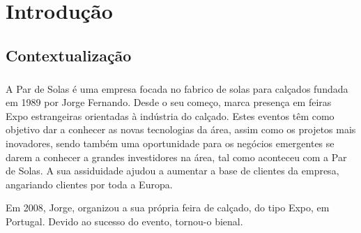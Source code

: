 \documentclass[a4paper,12pt]{scrreprt}
\begin{document}


\renewcommand{\contentsname}{Índice}
\tableofcontents

\pagebreak

\listoffigures

\pagebreak





\chapter{Introdução}
    \section{Contextualização}
    \paragraph{}
    A Par de Solas é uma empresa focada no fabrico de solas para calçados fundada em 1989 por Jorge Fernando. Desde o seu começo, marca presença em feiras Expo estrangeiras orientadas à indústria do calçado. Estes eventos têm como objetivo dar a conhecer as novas tecnologias da área, assim como os projetos mais inovadores, sendo também uma oportunidade para os negócios emergentes se darem a conhecer a grandes investidores na área, tal como aconteceu com a Par de Solas. A sua assiduidade ajudou a aumentar a base de clientes da empresa, angariando clientes por toda a Europa.
     
    Em 2008, Jorge, organizou a sua própria feira de calçado, do tipo Expo, em Portugal. Devido ao sucesso do evento, tornou-o bienal.
    
\end{document}
